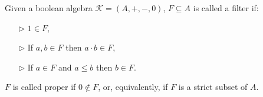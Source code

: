 \documentclass[10pt]{beamer}
\theoremstyle{definition}
\theoremstyle{definition}
\begin{document}

\begin{frame}\label{frame: filters and ultrafilters}

\begin{definition}[Filter]
Given a boolean algebra $\mathcal{K} = (A,+,-,0)$, $F\subseteq A$ is called a filter if:
\begin{enumerate}
\item[$\triangleright$] $1 \in F$,
\item[$\triangleright$] If $a,b \in F$ then $a \cdot b \in F$,
\item[$\triangleright$] If $a \in F$ and $a \leq b$ then $b \in F$.
\end{enumerate}
$F$ is called proper if $0 \notin F$, or, equivalently, if $F$ is a strict subset of $A$.
\end{definition}


\end{frame}
\end{document}
